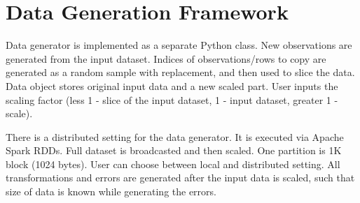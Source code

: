\section{Data Generation Framework}

Data generator is implemented as a separate Python class. New observations are generated from the input dataset. 
Indices of observations/rows to copy are generated as a random sample with replacement, and then used to slice the data.
Data object stores original input data and a new scaled part. User inputs the scaling factor (less 1 - slice of the input dataset, 1 - input dataset, greater 1 - scale).

There is a distributed setting for the data generator. It is executed via Apache Spark RDDs. 
Full dataset is broadcasted and then scaled. One partition is 1K block (1024 bytes).
User can choose between local and distributed setting. All transformations and errors are generated after the input data is scaled, such that size of data is known while generating the errors.
